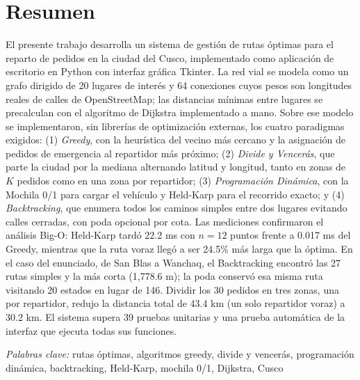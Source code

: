 \chapter*{Resumen}

El presente trabajo desarrolla un sistema de gestión de rutas óptimas para el reparto de pedidos en la ciudad del Cusco, implementado como aplicación de escritorio en Python con interfaz gráfica Tkinter. La red vial se modela como un grafo dirigido de 20 lugares de interés y 64 conexiones cuyos pesos son longitudes reales de calles de OpenStreetMap; las distancias mínimas entre lugares se precalculan con el algoritmo de Dijkstra implementado a mano. Sobre ese modelo se implementaron, sin librerías de optimización externas, los cuatro paradigmas exigidos: (1) \textit{Greedy}, con la heurística del vecino más cercano y la asignación de pedidos de emergencia al repartidor más próximo; (2) \textit{Divide y Vencerás}, que parte la ciudad por la mediana alternando latitud y longitud, tanto en zonas de $K$ pedidos como en una zona por repartidor; (3) \textit{Programación Dinámica}, con la Mochila 0/1 para cargar el vehículo y Held-Karp para el recorrido exacto; y (4) \textit{Backtracking}, que enumera todos los caminos simples entre dos lugares evitando calles cerradas, con poda opcional por cota. Las mediciones confirmaron el análisis Big-O: Held-Karp tardó 22.2 ms con $n=12$ puntos frente a 0.017 ms del Greedy, mientras que la ruta voraz llegó a ser 24.5\% más larga que la óptima. En el caso del enunciado, de San Blas a Wanchaq, el Backtracking encontró las 27 rutas simples y la más corta (1,778.6 m); la poda conservó esa misma ruta visitando 20 estados en lugar de 146. Dividir los 30 pedidos en tres zonas, una por repartidor, redujo la distancia total de 43.4 km (un solo repartidor voraz) a 30.2 km. El sistema supera 39 pruebas unitarias y una prueba automática de la interfaz que ejecuta todas sus funciones.

\textit{Palabras clave:} rutas óptimas, algoritmos greedy, divide y vencerás, programación dinámica, backtracking, Held-Karp, mochila 0/1, Dijkstra, Cusco
